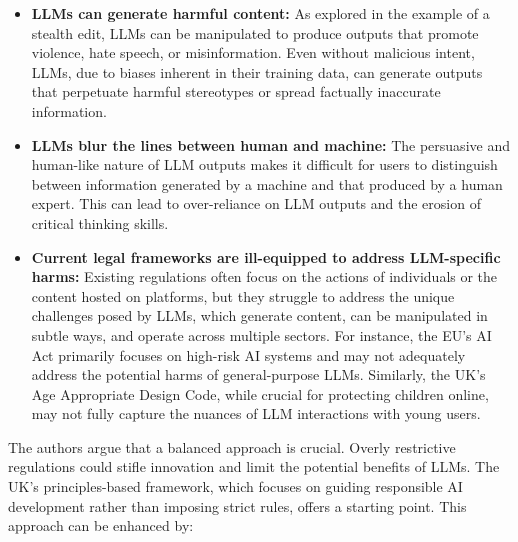 \begin{itemize}
    \item \textbf{LLMs can generate harmful content:} As explored in the example of a stealth edit, LLMs can be manipulated to produce outputs that promote violence, hate speech, or misinformation. Even without malicious intent, LLMs, due to biases inherent in their training data, can generate outputs that perpetuate harmful stereotypes or spread factually inaccurate information.
    
    \item \textbf{LLMs blur the lines between human and machine:} The persuasive and human-like nature of LLM outputs makes it difficult for users to distinguish between information generated by a machine and that produced by a human expert. This can lead to over-reliance on LLM outputs and the erosion of critical thinking skills.
    
    \item \textbf{Current legal frameworks are ill-equipped to address LLM-specific harms:} Existing regulations often focus on the actions of individuals or the content hosted on platforms, but they struggle to address the unique challenges posed by LLMs, which generate content, can be manipulated in subtle ways, and operate across multiple sectors. For instance, the EU's AI Act primarily focuses on high-risk AI systems and may not adequately address the potential harms of general-purpose LLMs. Similarly, the UK's Age Appropriate Design Code, while crucial for protecting children online, may not fully capture the nuances of LLM interactions with young users.
\end{itemize}

The authors argue that a balanced approach is crucial. Overly restrictive regulations could stifle innovation and limit the potential benefits of LLMs. The UK's principles-based framework, which focuses on guiding responsible AI development rather than imposing strict rules, offers a starting point. This approach can be enhanced by:

